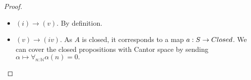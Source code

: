 \begin{proof}
\begin{itemize}
%     
%
%
%
%
%
%
%
%
%
%
%
%
   \item $(i) \to (v)$. By definition.
   \item $(v) \to (iv)$.
     As $A$ is closed, it corresponds to a map $a:S\to \Closed$. 
     We can cover the closed propositions with Cantor space
     by sending 
     $\alpha \mapsto \forall_{n:\mathbb N} \alpha (n) = 0.$

\end{itemize}
\end{proof}
